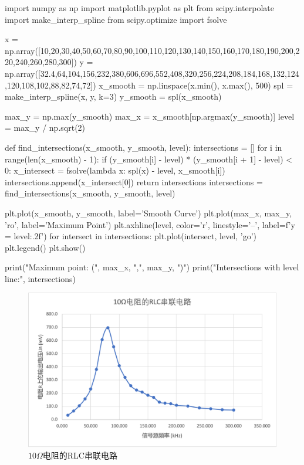 \documentclass{article}
\begin{document}
\begin{python}
import numpy as np
import matplotlib.pyplot as plt
from scipy.interpolate import make_interp_spline
from scipy.optimize import fsolve

x = np.array([10,20,30,40,50,60,70,80,90,100,110,120,130,140,150,160,170,180,190,200,220,240,260,280,300])
y = np.array([32.4,64,104,156,232,380,606,696,552,408,320,256,224,208,184,168,132,124,120,108,102,88,82,74,72])
x_smooth = np.linspace(x.min(), x.max(), 500)
spl = make_interp_spline(x, y, k=3)
y_smooth = spl(x_smooth)

max_y = np.max(y_smooth)
max_x = x_smooth[np.argmax(y_smooth)]
level = max_y / np.sqrt(2)

def find_intersections(x_smooth, y_smooth, level):
    intersections = []
    for i in range(len(x_smooth) - 1):
        if (y_smooth[i] - level) * (y_smooth[i + 1] - level) < 0:
            x_intersect = fsolve(lambda x: spl(x) - level, x_smooth[i])
            intersections.append(x_intersect[0])
    return intersections
intersections = find_intersections(x_smooth, y_smooth, level)

plt.plot(x_smooth, y_smooth, label='Smooth Curve')
plt.plot(max_x, max_y, 'ro', label='Maximum Point')
plt.axhline(level, color='r', linestyle='--', label=f'y = {level:.2f}')
for intersect in intersections:
    plt.plot(intersect, level, 'go')
plt.legend()
plt.show()

print("Maximum point: (", max_x, ",", max_y, ")")
print("Intersections with level line:", intersections)
\end{python}

\newpage

\begin{figure}[htbp]
    \centering
    \includegraphics[width=1.0\textwidth]{1-2.png}
    \caption{$10\Omega$电阻的RLC串联电路}
\end{figure}
\end{document}
